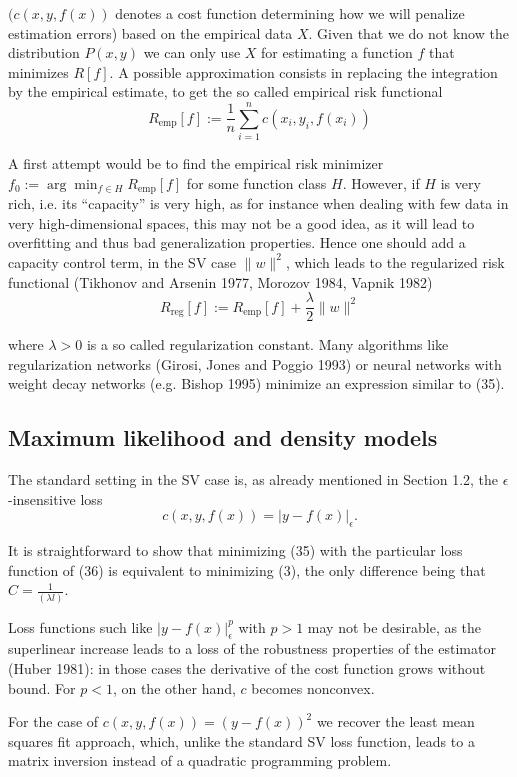 \documentclass[fleqn,10pt]{olplainarticle}
\begin{document}
$(c(x, y, f (x))$ denotes a cost function determining how we will penalize estimation errors) based on the empirical data $X$. Given that we do not know the distribution $P(x, y)$ we can only use $X$ for estimating a function $f$ that minimizes $R[ f ]$. A possible approximation consists in replacing the integration by the empirical estimate, to get the so called empirical risk functional
\[ R_{\text{emp}}[ f ] := \frac{1}{n} \sum_{i=1}^{n} c(x_i, y_i, f (x_i )) \]

A first attempt would be to find the empirical risk minimizer $f_0 := \arg \min_{f \in H} R_{\text{emp}}[ f ]$ for some function class $H$. However, if $H$ is very rich, i.e. its “capacity” is very high, as for instance when dealing with few data in very high-dimensional spaces, this may not be a good idea, as it will lead to overfitting and thus bad generalization properties. Hence one should add a capacity control term, in the SV case $\|w\|^2$, which leads to the regularized
risk functional (Tikhonov and Arsenin 1977, Morozov 1984, Vapnik 1982)
\[ R_{\text{reg}}[ f ] := R_{\text{emp}}[ f ] + \frac{\lambda}{2} \|w\|^2 \]

where $\lambda > 0$ is a so called regularization constant. Many algorithms like regularization networks (Girosi, Jones and Poggio 1993) or neural networks with weight decay networks (e.g. Bishop 1995) minimize an expression similar to (35).

\subsection{Maximum likelihood and density models}
The standard setting in the SV case is, as already mentioned in
Section 1.2, the $\epsilon$-insensitive loss
\[ c(x, y, f (x)) = |y - f (x)|_{\epsilon}. \]

It is straightforward to show that minimizing (35) with the particular loss function of (36) is equivalent to minimizing (3), the only difference being that $C = \frac{1}{(\lambda l)}$.

Loss functions such like $|y - f (x)|^p_\epsilon$ with $p > 1$ may not be desirable, as the superlinear increase leads to a loss of the robustness properties of the estimator (Huber 1981): in those cases the derivative of the cost function grows without bound. For $p < 1$, on the other hand, $c$ becomes nonconvex.

For the case of $c(x, y, f (x)) = (y - f (x))^2$ we recover the least mean squares fit approach, which, unlike the standard SV loss function, leads to a matrix inversion instead of a quadratic programming problem.
\end{document}

